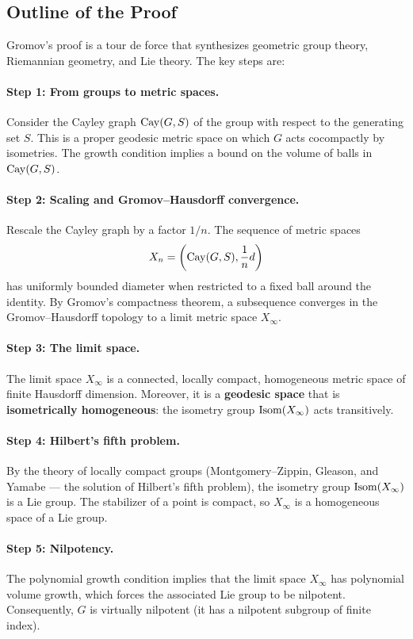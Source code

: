 \subsection{Outline of the Proof}

Gromov's proof is a tour de force that synthesizes geometric group theory, Riemannian geometry, and Lie theory. The key steps are:

\paragraph{Step 1: From groups to metric spaces.}
Consider the Cayley graph \(\operatorname{Cay}(G, S)\) of the group with respect to the generating set \(S\). This is a proper geodesic metric space on which \(G\) acts cocompactly by isometries. The growth condition implies a bound on the volume of balls in \(\operatorname{Cay}(G, S)\).

\paragraph{Step 2: Scaling and Gromov--Hausdorff convergence.}
Rescale the Cayley graph by a factor \(1/n\). The sequence of metric spaces
\[
X_n = \left(\operatorname{Cay}(G, S), \frac{1}{n} d\right)
\]
has uniformly bounded diameter when restricted to a fixed ball around the identity. By Gromov's compactness theorem, a subsequence converges in the Gromov--Hausdorff topology to a limit metric space \(X_\infty\).

\paragraph{Step 3: The limit space.}
The limit space \(X_\infty\) is a connected, locally compact, homogeneous metric space of finite Hausdorff dimension. Moreover, it is a \textbf{geodesic space} that is \textbf{isometrically homogeneous}: the isometry group \(\operatorname{Isom}(X_\infty)\) acts transitively.

\paragraph{Step 4: Hilbert's fifth problem.}
By the theory of locally compact groups (Montgomery--Zippin, Gleason, and Yamabe --- the solution of Hilbert's fifth problem), the isometry group \(\operatorname{Isom}(X_\infty)\) is a Lie group. The stabilizer of a point is compact, so \(X_\infty\) is a homogeneous space of a Lie group.

\paragraph{Step 5: Nilpotency.}
The polynomial growth condition implies that the limit space \(X_\infty\) has polynomial volume growth, which forces the associated Lie group to be nilpotent. Consequently, \(G\) is virtually nilpotent (it has a nilpotent subgroup of finite index).

